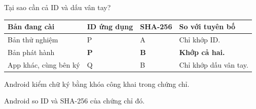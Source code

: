 \begin{frame}[t]{Tại sao cần cả ID và dấu vân tay?}
  \medskip
  \noindent{}\par\smallskip
  {%
    \setlength{\tabcolsep}{4pt}
    \begin{tabularx}{\linewidth}{L{.28\linewidth}L{.18\linewidth}L{.155\linewidth}Y}
      \toprule
      \textbf{Bản đang cài} & \textbf{ID ứng dụng} & \textbf{SHA-256} & \textbf{So với tuyên bố}\\
      \midrule
      Bản thử nghiệm & P & A & Chỉ khớp ID.\\
       Bản phát hành & \textbf{P} & \textbf{B} & \textcolor{Action}{\textbf{Khớp cả hai.}}\\
      App khác, cùng bên ký & Q & B & Chỉ khớp dấu vân tay.\\
      \bottomrule
    \end{tabularx}\par
  }
  \medskip
  \noindent{}\enspace Android kiểm chữ ký bằng khóa công khai trong chứng chỉ.\par\smallskip
  \noindent{}\enspace Android so ID và SHA-256 của chứng chỉ đó.\par
\end{frame}

